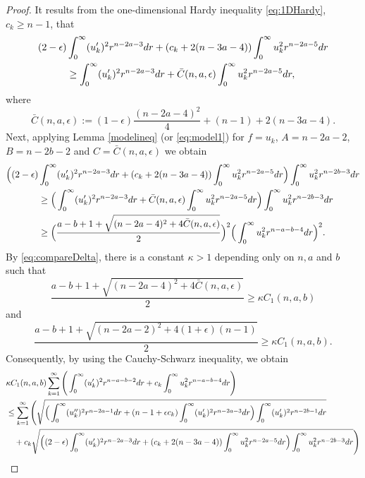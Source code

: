 \documentclass[a4paper,12pt]{article}
\theoremstyle{plain}
\theoremstyle{definition}
\theoremstyle{remark}
\def\ep{\epsilon}%
\numberwithin{equation}{section}
\begin{document}
\begin{proof}
It results from the one-dimensional Hardy inequality \eqref{eq:1DHardy}, $c_k \geq n-1$, that 
\begin{align*}%
(2-\epsilon)&\int_0^\infty (u_k')^2 r^{n-2a -3} dr + (c_k + 2(n-3a -4))\int_0^\infty u_k^2 r^{n-2a -5} dr \notag\\
&\geq \int_0^\infty (u_k')^2 r^{n-2a -3} dr + \bar{C}(n,a,\ep)\int_0^\infty u_k^2 r^{n-2a -5} dr,
\end{align*}
where \[
\bar{C}(n,a,\epsilon) :=(1-\epsilon)\frac{(n -2a -4)^2}4 + (n-1) + 2(n-3a -4).
\]
Next, applying Lemma \ref{modelineq} (or \eqref{eq:model1}) for $f = u_k$, $A = n-2a -2$, $B = n-2b-2$ and $C = \bar{C}(n,a,\ep)$ we obtain 
\begin{align*}%
\Big((2-\epsilon)&\int_0^\infty (u_k')^2 r^{n-2a -3} dr + (c_k + 2(n-3a -4))\int_0^\infty u_k^2 r^{n-2a -5} dr\Big) \int_0^\infty u_k^2 r^{n-2b - 3} dr\notag\\
&\geq \Big(\int_0^\infty (u_k')^2 r^{n-2a -3} dr + \bar{C}(n,a,\ep)\int_0^\infty u_k^2 r^{n-2a -5} dr\Big) \int_0^\infty u_k^2 r^{n-2b - 3} dr\notag\\
&\geq \Big(\frac{a-b+1 + \sqrt{(n-2a -4)^2 + 4\bar{C}(n,a,\ep)}}2\Big)^2 \Big(\int_0^\infty u_k^2 r^{n-a -b - 4} dr\Big)^2.
\end{align*}
By \eqref{eq:compareDelta},  there is a constant $\kappa > 1$ depending only on $n,a$ and $b$ such that
\[
\frac{a-b+1 + \sqrt{(n-2a -4)^2 + 4\bar{C}(n,a,\ep)}}2 \geq \kappa C_1(n,a,b)
\]
and
\[
\frac{a-b+1 + \sqrt{(n-2a -2)^2 + 4(1+\ep)(n-1)}}2 \geq \kappa C_1(n,a,b).
\]
Consequently, by using the Cauchy-Schwarz inequality, we obtain
\begin{align*}
&\kappa C_1(n,a,b)\sum_{k=1}^\infty\Bigg(\int_0^\infty (u_k')^2 r^{n-a -b-2} dr + c_k \int_0^\infty u_k^2 r^{n -a-b -4} dr\Bigg)\notag\\
&\leq \sum_{k=1}^\infty\Bigg(\sqrt{\Big(\int_0^\infty (u_k'')^2 r^{n-2a -1} dr + (n-1 +\epsilon c_k) \int_0^\infty (u_k')^2 r^{n-2a -3} dr\Big)\int_0^\infty (u_k')^2 r^{n-2b -1} dr}\notag\\
&\quad + c_k\sqrt{\Big((2-\epsilon)\int_0^\infty (u_k')^2 r^{n-2a -3} dr + (c_k + 2(n-3a -4))\int_0^\infty u_k^2 r^{n-2a -5} dr\Big) \int_0^\infty u_k^2 r^{n-2b - 3} dr}\Bigg)\notag\\

\end{align*}
\end{proof}
\end{document}
